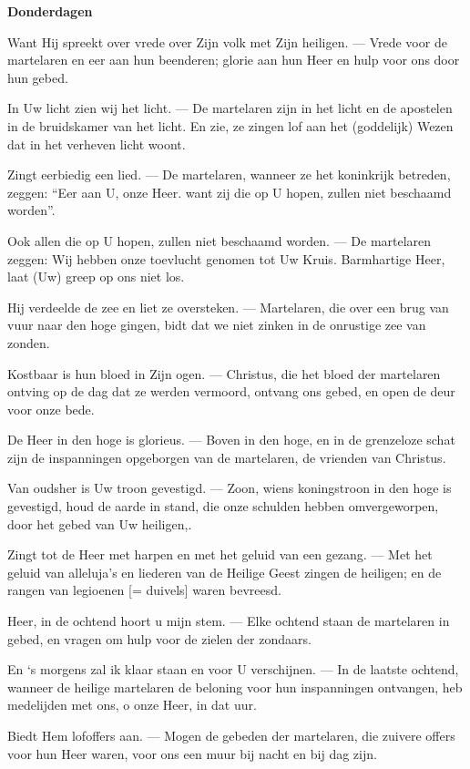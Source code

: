 \documentclass[12pt,twoside,a5paper]{article}
\newlength{\origparskip}
\newenvironment{halfparskip}{
  \setlength{\parskip}{0.5\origparskip}
}{
  \setlength{\parskip}{\origparskip}
}
\newcommand{\liturgicaloption}[1]{{\color{BrickRed}\textbf{#1}}}
\newcommand{\markedday}[1]{%
  \liturgicaloption{#1}%
  \markright{#1}%
}
\begin{document}
\markedday{Donderdagen}

\begin{halfparskip}
  Want Hij spreekt over vrede over Zijn volk met Zijn heiligen. --- Vrede voor de martelaren en eer aan hun beenderen; glorie aan hun Heer en hulp voor ons door hun gebed.

  In Uw licht zien wij het licht. --- De martelaren zijn in het licht en de apostelen in de bruidskamer van het licht. En zie, ze zingen lof aan het (goddelijk) Wezen dat in het verheven licht woont.

  Zingt eerbiedig een lied. --- De martelaren, wanneer ze het koninkrijk betreden, zeggen: ``Eer aan U, onze Heer. want zij die op U hopen, zullen niet beschaamd worden''.

  Ook allen die op U hopen, zullen niet beschaamd worden. --- De martelaren zeggen: Wij hebben onze toevlucht genomen tot Uw Kruis. Barmhartige Heer, laat (Uw) greep op ons niet los.

  Hij verdeelde de zee en liet ze oversteken. --- Martelaren, die over een brug van vuur naar den hoge gingen, bidt dat we niet zinken in de onrustige zee van zonden.

  Kostbaar is hun bloed in Zijn ogen. --- Christus, die het bloed der martelaren ontving op de dag dat ze werden vermoord, ontvang ons gebed, en open de deur voor onze bede.

  De Heer in den hoge is glorieus. --- Boven in den hoge, en in de grenzeloze schat zijn de inspanningen opgeborgen van de martelaren, de vrienden van Christus.

  Van oudsher is Uw troon gevestigd. --- Zoon, wiens koningstroon in den hoge is gevestigd, houd de aarde in stand, die onze schulden hebben omvergeworpen, door het gebed van Uw heiligen,.

  Zingt tot de Heer met harpen en met het geluid van een gezang. --- Met het geluid van alleluja's en liederen van de Heilige Geest zingen de heiligen; en de rangen van legioenen [= duivels] waren bevreesd.

  Heer, in de ochtend hoort u mijn stem. --- Elke ochtend staan de martelaren in gebed, en vragen om hulp voor de zielen der zondaars.

  En `s morgens zal ik klaar staan en voor U verschijnen. --- In de laatste ochtend, wanneer de heilige martelaren de beloning voor hun inspanningen ontvangen, heb medelijden met ons, o onze Heer, in dat uur.

  Biedt Hem lofoffers aan. --- Mogen de gebeden der martelaren, die zuivere offers voor hun Heer waren, voor ons een muur bij nacht en bij dag zijn.


\end{halfparskip}
\end{document}
